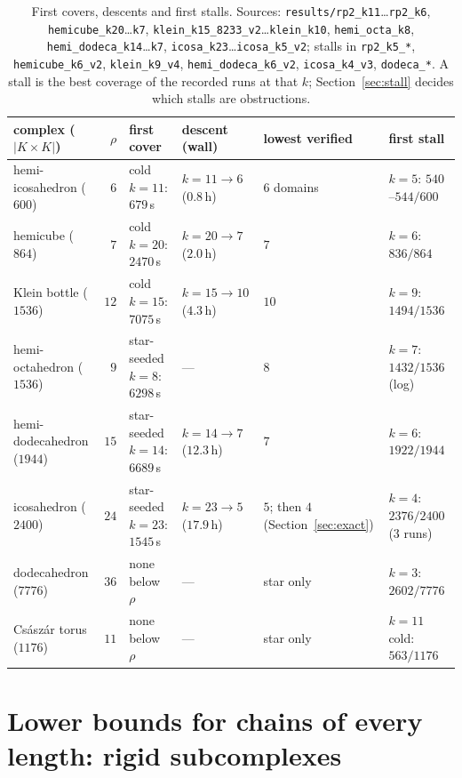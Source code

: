 \documentclass[12pt]{article}
\begin{document}
\begin{table}[H]
\centering\footnotesize
\setlength{\tabcolsep}{3pt}
\begin{tabular}{@{}l r>{\raggedright\arraybackslash}p{2.9cm}>{\raggedright\arraybackslash}p{2.5cm}>{\raggedright\arraybackslash}p{1.9cm}>{\raggedright\arraybackslash}p{2.4cm}@{}}
\toprule
complex ($|K{\times}K|$) & $\rho$ & first cover & descent (wall) & lowest verified & first stall \\
\midrule
hemi-icosahedron ($600$) & $6$ & cold $k{=}11$: $679$\,s & $k{=}11\to6$ ($0.8$\,h) & $6$ domains & $k{=}5$: $540$--$544/600$\\
hemicube ($864$) & $7$ & cold $k{=}20$: $2470$\,s & $k{=}20\to7$ ($2.0$\,h) & $7$ & $k{=}6$: $836/864$\\
Klein bottle ($1536$) & $12$ & cold $k{=}15$: $7075$\,s & $k{=}15\to10$ ($4.3$\,h) & $10$ & $k{=}9$: $1494/1536$\\
hemi-octahedron ($1536$) & $9$ & star-seeded $k{=}8$: $6298$\,s & --- & $8$ & $k{=}7$: $1432/1536$ (log)\\
hemi-dodecahedron ($1944$) & $15$ & star-seeded $k{=}14$: $6689$\,s & $k{=}14\to7$ ($12.3$\,h) & $7$ & $k{=}6$: $1922/1944$\\
icosahedron ($2400$) & $24$ & star-seeded $k{=}23$: $1545$\,s & $k{=}23\to5$ ($17.9$\,h) & $5$; then $4$ (Section~\ref{sec:exact}) & $k{=}4$: $2376/2400$ ($3$ runs)\\
dodecahedron ($7776$) & $36$ & none below $\rho$ & --- & star only & $k{=}3$: $2602/7776$\\
Cs\'asz\'ar torus ($1176$) & $11$ & none below $\rho$ & --- & star only & $k{=}11$ cold: $563/1176$\\
\bottomrule
\end{tabular}
\caption{First covers, descents and first stalls.  Sources:
\texttt{results/rp2\_k11}\dots\texttt{rp2\_k6},
\texttt{hemicube\_k20}\dots\texttt{k7}, \texttt{klein\_k15\_8233\_v2}\dots\texttt{klein\_k10},
\texttt{hemi\_octa\_k8}, \texttt{hemi\_dodeca\_k14}\dots\texttt{k7},
\texttt{icosa\_k23}\dots\texttt{icosa\_k5\_v2}; stalls in \texttt{rp2\_k5\_*},
\texttt{hemicube\_k6\_v2}, \texttt{klein\_k9\_v4}, \texttt{hemi\_dodeca\_k6\_v2},
\texttt{icosa\_k4\_v3}, \texttt{dodeca\_*}.  A stall is the best coverage of
the recorded runs at that $k$; Section~\ref{sec:stall} decides which stalls
are obstructions.}
\label{tab:descent}
\end{table}

\section{Lower bounds for chains of every length: rigid subcomplexes}\label{sec:rigid}
\end{document}

